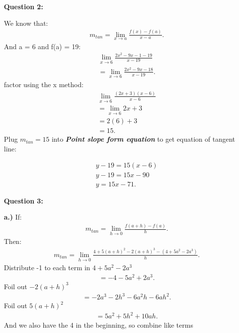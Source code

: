\documentclass{report}
\begin{document}
    \bigbreak \noindent \bigbreak \noindent \bigbreak \noindent 
    \begin{Large}
        \textbf{Question 2:}
    \end{Large}
    \bigbreak \noindent 
    \bigbreak \noindent 
    We know that:
    \begin{align*}
        m_{tan} = \lim\limits_{x \to a}{\frac{f(x) - f(a)}{x -a}}
    .\end{align*}
    \bigbreak \noindent 
    And a = 6 and f(a) = 19:
    \begin{align*}
        \lim\limits_{x \to 6}{ \frac{2x^2-9x-1-19}{x-19}} \\
        = \lim\limits_{x \to 6}{ \frac{2x^2 -9x -18}{x - 19}}
    .\end{align*}
    \bigbreak \noindent 
    factor using the x method:
    \begin{align*}
        \lim\limits_{x \to 6}{ \frac{ \left(2x+3\right) \left(x-6\right)}{x-6}} \\ 
        = \lim\limits_{x \to 6}{2x+3} \\ 
        = 2 \left(6\right) + 3 \\ 
        =15
    .\end{align*}
    \bigbreak \noindent 
    Plug $m_{tan} = 15$ into \textbf{\textit{Point slope form equation}} to get equation of tangent line:

    \begin{align*}
        y - 19 = 15 \left(x-6\right) \\ 
        y - 19 = 15x - 90 \\ 
        y = 15x - 71
    .\end{align*}

    \bigbreak \noindent \bigbreak \noindent \bigbreak \noindent 
    \begin{Large}
        \textbf{Question 3:}
    \end{Large}
    \bigbreak \noindent 
    \bigbreak \noindent 
    \textbf{a.)}
    \bigbreak \noindent If:
    \begin{align*}
        m_{tan} = \lim\limits_{h \to 0}{ \frac{f(a+h) - f(a)}{h}}
    .\end{align*}
    \bigbreak \noindent Then:
    \begin{align*}
        m_{tan} = \lim\limits_{h \to 0}{ \frac{4 + 5\left(a+h\right)^2 - 2 \left(a+h\right)^3 - \left(4+5a^2-2a^3\right)}{h}}
    .\end{align*}
    \bigbreak \noindent     
    \bigbreak \noindent 
    Distribute -1 to each term in $4+5a^2-2a^3$
    \begin{align*}
        = -4 -5a^2+2a^3
    .\end{align*}
    \bigbreak \noindent 
    Foil out $-2 \left(a+h\right)^3$
    \begin{align*}
        = -2a^3-2h^3-6a^2h-6ah^2
    .\end{align*}
    \bigbreak \noindent 
    Foil out $5 \left(a+h\right)^2$
    \begin{align*}
        = 5a^2+5h^2+10ah
    .\end{align*}
    \bigbreak \noindent 
    And we also have the 4 in the beginning, so combine like terms
\end{document}
